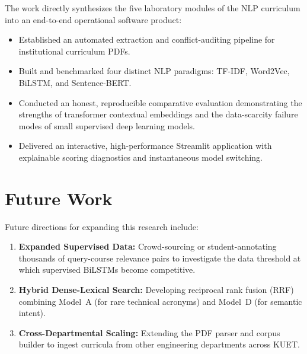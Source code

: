 \documentclass[12pt,a4paper]{report}
\begin{document}
The work directly synthesizes the five laboratory modules of the NLP curriculum into an end-to-end operational software product:
\begin{itemize}
    \item Established an automated extraction and conflict-auditing pipeline for institutional curriculum PDFs.
    \item Built and benchmarked four distinct NLP paradigms: TF-IDF, Word2Vec, BiLSTM, and Sentence-BERT.
    \item Conducted an honest, reproducible comparative evaluation demonstrating the strengths of transformer contextual embeddings and the data-scarcity failure modes of small supervised deep learning models.
    \item Delivered an interactive, high-performance Streamlit application with explainable scoring diagnostics and instantaneous model switching.
\end{itemize}

\section{Future Work}
Future directions for expanding this research include:
\begin{enumerate}
    \item \textbf{Expanded Supervised Data:} Crowd-sourcing or student-annotating thousands of query-course relevance pairs to investigate the data threshold at which supervised BiLSTMs become competitive.
    \item \textbf{Hybrid Dense-Lexical Search:} Developing reciprocal rank fusion (RRF) combining Model~A (for rare technical acronyms) and Model~D (for semantic intent).
    \item \textbf{Cross-Departmental Scaling:} Extending the PDF parser and corpus builder to ingest curricula from other engineering departments across KUET.
\end{enumerate}
\end{document}
